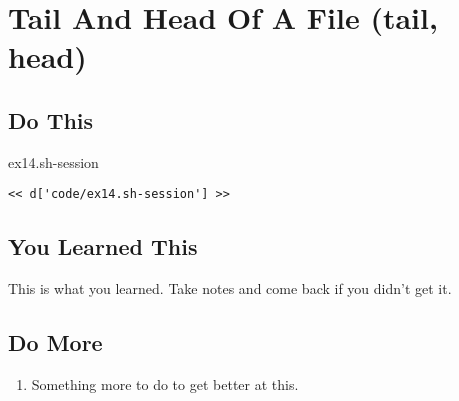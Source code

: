 \chapter{Tail And Head Of A File (tail, head)}

\section{Do This}

\begin{code}{ex14.sh-session}
\begin{Verbatim}
<< d['code/ex14.sh-session'] >>
\end{Verbatim}
\end{code}


\section{You Learned This}

This is what you learned.  Take notes and come back if you didn't get it.

\section{Do More}

\begin{enumerate}
\item Something more to do to get better at this.
\end{enumerate}


